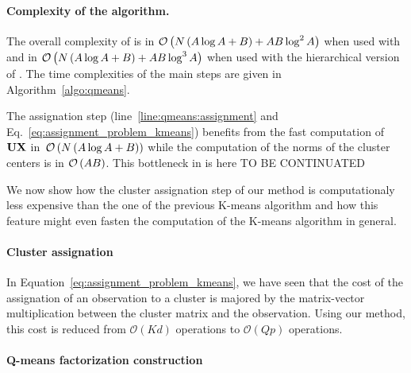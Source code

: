 %

\paragraph{Complexity of the \qkmeans algorithm.} The overall complexity of \qkmeans is in $\mathcal{O}\left (N\left(A\log A+B\right ) + AB \log^2 A\right )$ when used with \palm and in $\mathcal{O}\left (N\left(A\log A+B\right ) + AB \log^3 A\right )$ when used with the hierarchical version of \palm. The time complexities of the main steps are given in Algorithm~\ref{algo:qmeans}. 

The assignation step (line~\ref{line:qmeans:assignment} and Eq.~\eqref{eq:assignment_problem_kmeans}) benefits from the fast computation of ${\mathbf{U}} {\mathbf{X}}$ in~$\mathcal{O}\left (N\left(A\log A+B\right )\right )$ while the computation of the norms of the cluster centers is in $\mathcal{O}\left (AB\right )$.
This bottleneck in \kmeans is here TO BE CONTINUATED

We now show how the cluster assignation step of our method is computationaly less expensive than the one of the previous K-means algorithm and how this feature might even fasten the computation of the K-means algorithm in general.

\paragraph{Cluster assignation}

In Equation~\ref{eq:assignment_problem_kmeans}, we have seen that the cost of the assignation of an observation to a cluster is majored by the matrix-vector multiplication between the cluster matrix and the observation. Using our method, this cost is reduced from $\mathcal{O}(Kd)$ operations to $\mathcal{O}(Qp)$ operations. 

\paragraph{Q-means factorization construction}

